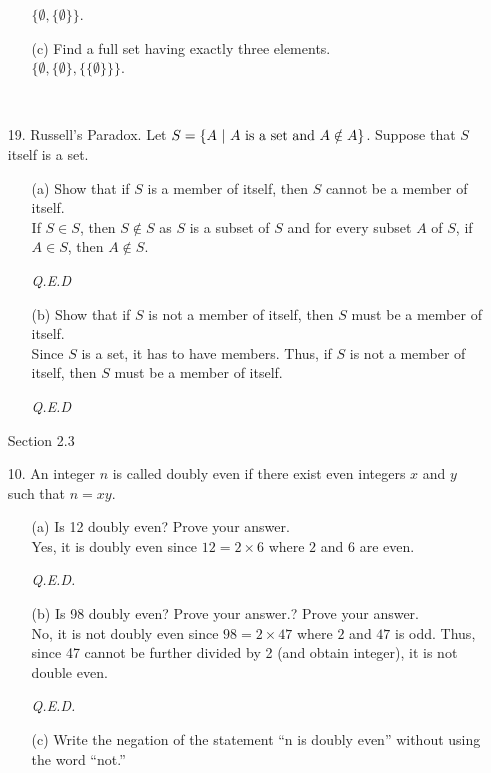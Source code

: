 \documentclass[12pt, a4paper]{article}                  %
\begin{document}
\begin{enumerate}
\begin{enumerate}
$\{\emptyset,\{\emptyset\}\}$.
\\
\item[(c)]
Find a full set having exactly three elements.\\

$\{\emptyset,\{\emptyset\},\{\{\emptyset\}\}\}$.
\end{enumerate}

\

\item[19.]
Russell's Paradox. Let $S = \{A \ \vert \ A \ \textnormal{is a set and} \ A \notin A\}$.
Suppose that $S$ itself is a set.
\begin{enumerate}
\item[(a)]
Show that if $S$ is a member of itself, then $S$ cannot be a member of itself.\\

If $S \in S$, then $S \notin S$ as $S$ is a subset of $S$ and for every subset $A$
of $S$, if $A \in S$, then $A \notin S$.
\begin{flushright}
\textit{Q.E.D}
\end{flushright}
\item[(b)]
Show that if $S$ is not a member of itself, then $S$ must be a member of itself.\\

Since $S$ is a set, it has to have members.
Thus, if $S$ is not a member of itself, then $S$ must be a member of itself.
\begin{flushright}
\textit{Q.E.D}
\end{flushright}
\end{enumerate}

{\large Section 2.3}
\\

\item[10.]
An integer $n$ is called doubly even if there exist even integers $x$ and $y$ such that $n = xy$.
\begin{enumerate}
\item[(a)]
Is 12 doubly even? Prove your answer.\\

Yes, it is doubly even since $12 = 2 \times 6$ where $2$ and $6$ are even.
\begin{flushright}
\textit{Q.E.D.}
\end{flushright}
\item[(b)]
Is 98 doubly even? Prove your answer.? Prove your answer.\\

No, it is not doubly even since $98 = 2 \times 47$ where $2$ and $47$ is odd.
Thus, since 47 cannot be further divided by 2 (and obtain integer), it is not double even.
\begin{flushright}
\textit{Q.E.D.}
\end{flushright}
\item[(c)]
Write the negation of the statement “n is doubly even” without using the word
“not.”\\


\end{enumerate}
\end{enumerate}
\end{document}
